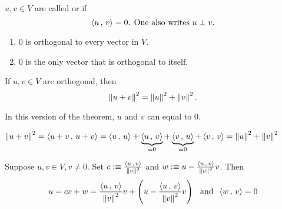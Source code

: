 \setcounter{thm}{9}
\begin{mydef}[orthogonal]
  $u,v \in V$ are called  or  if
  \begin{equation}
    \ip{u}{v} =0$. One also writes $u \perp v.
  \end{equation}
\end{mydef}

\begin{thm} 
  \phantom{.}
  \begin{enumerate}[label=\textbf{(\alph*)}]
    \item $0$ is orthogonal to every vector in $V$.
    \item $0$ is the only vector that is orthogonal to itself.
  \end{enumerate}
\end{thm}

\begin{thm}
  \label{thm: pythagorean theorem}
  If $u,v \in V$ are orthogonal, then
  \begin{equation}
    \left \lVert u+v \right \rVert^2 = \left \lVert u \right \rVert^2 + \left \lVert v \right \rVert^2.
  \end{equation}

  In this version of the theorem, $u$ and $v$ can equal to $0$.
\end{thm}
\begin{prf}
  $\left \lVert u+v \right \rVert^2 = \left \langle u+v \, , \, u+v \right \rangle = \left \langle u \, , \, u \right \rangle + \underbrace{\left \langle u \, , \, v \right \rangle}_{=0} + \underbrace{\left \langle v \, , \, u \right \rangle}_{=0} + \left \langle v \, , \, v \right \rangle = \left \lVert u \right \rVert^2 + \left \lVert v \right \rVert^2 $
\end{prf}

\setcounter{thm}{12}
\begin{thm}
  \label{thm: an orthogonal decomposition}
  Suppose $u,v \in V, v\neq 0.$ Set $c :\equiv \frac{\left \langle u \, , \, v \right \rangle}{\left \lVert v \right \rVert^2}$ and $w :\equiv u-\frac{\left \langle u \, , \, v \right \rangle}{\left \lVert v \right \rVert^2}v$. Then
  \begin{equation}
    u = cv+w = \frac{\left \langle u \, , \, v \right \rangle}{\left \lVert v \right \rVert^2} v + \left( u- \frac{\left \langle u \, , \, v \right \rangle}{\left \lVert v \right \rVert^2} v \right  ) \;\;\, \text{and}\;\; \left \langle w \, , \, v \right \rangle=0
  \end{equation}
\end{thm}

